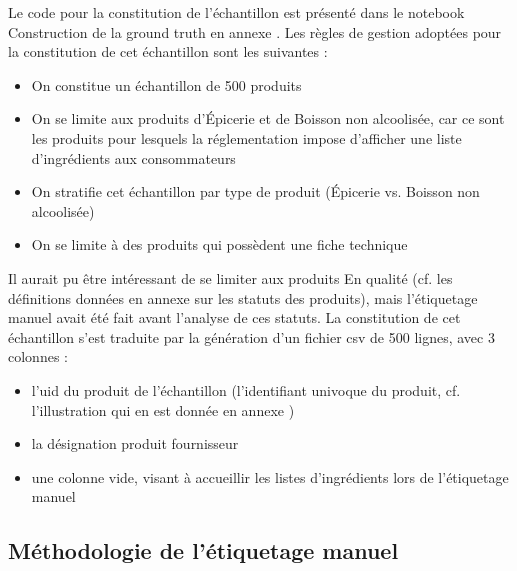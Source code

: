             Le code pour la constitution de l'échantillon est présenté dans le notebook \og Construction de la ground truth \fg en annexe .
            Les règles de gestion adoptées pour la constitution de cet échantillon sont les suivantes :
            \begin{itemize}
                \item On constitue un échantillon de 500 produits
                \item On se limite aux produits d'\'{E}picerie et de Boisson non alcoolisée, car ce sont les produits pour lesquels la réglementation impose d'afficher une liste d'ingrédients aux consommateurs
                \item On stratifie cet échantillon par type de produit (\'{E}picerie vs. Boisson non alcoolisée)
                \item On se limite à des produits qui possèdent une fiche technique
            \end{itemize}
            Il aurait pu être intéressant de se limiter aux produits \og En qualité \fg (cf. les définitions données en annexe  sur les statuts des produits), mais l'étiquetage manuel avait été fait avant l'analyse de ces statuts.
            La constitution de cet échantillon s'est traduite par la génération d'un fichier csv de 500 lignes, avec 3 colonnes : 
            \begin{itemize}
                \item l'uid du produit de l'échantillon (l'identifiant univoque du produit, cf. l'illustration qui en est donnée en annexe )
                \item la désignation produit fournisseur
                \item une colonne vide, visant à accueillir les listes d'ingrédients lors de l'étiquetage manuel
            \end{itemize}

            \subsection{Méthodologie de l'étiquetage manuel}

